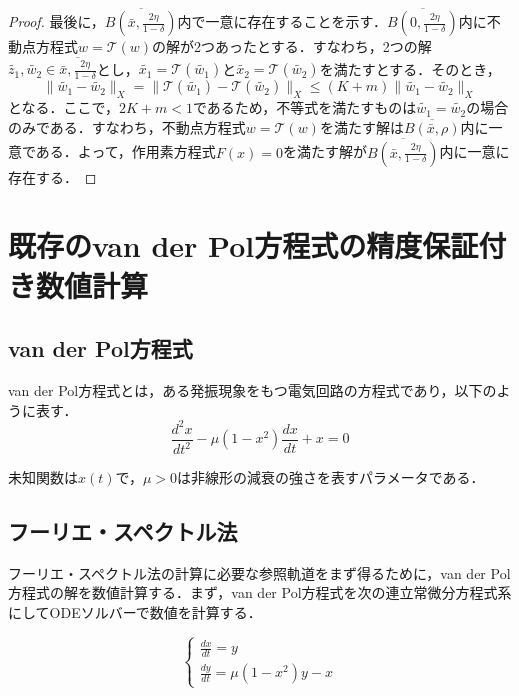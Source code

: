 \documentclass[11pt,a4paper,titlepage]{jsreport}
\theoremstyle{definition}
\providecommand{\DIFdelbegin}{} %
\providecommand{\DIFdelend}{} %
\newcommand{\DIFscaledelfig}{0.5}
\newlength{\DIFdelgraphicswidth} %
\newlength{\DIFdelgraphicsheight} %
\newcommand{\DIFdelincludegraphics}[2][]{%
\sbox{\DIFdelgraphicsbox}{\DIFOincludegraphics[#1]{#2}}%
\settoboxwidth{\DIFdelgraphicswidth}{\DIFdelgraphicsbox} %
\settoboxtotalheight{\DIFdelgraphicsheight}{\DIFdelgraphicsbox} %
\scalebox{\DIFscaledelfig}{%
\parbox[b]{\DIFdelgraphicswidth}{\usebox{\DIFdelgraphicsbox}\\[-\baselineskip] \rule{\DIFdelgraphicswidth}{0em}}\llap{\resizebox{\DIFdelgraphicswidth}{\DIFdelgraphicsheight}{%
\setlength{\unitlength}{\DIFdelgraphicswidth}%
\begin{picture}(1,1)%
\thicklines\linethickness{2pt} %
{\color[rgb]{1,0,0}\put(0,0){\framebox(1,1){}}}%
{\color[rgb]{1,0,0}\put(0,0){\line( 1,1){1}}}%
{\color[rgb]{1,0,0}\put(0,1){\line(1,-1){1}}}%
\end{picture}%
}\hspace*{3pt}}} %
} %
\DeclareRobustCommand{\DIFdelbegin}{\DIFOdelbegin \let\includegraphics\DIFdelincludegraphics} %
\DeclareRobustCommand{\DIFdelend}{\DIFOaddend \let\includegraphics\DIFOincludegraphics} %
\begin{document}
\begin{proof}
  最後に，$\overline{B\left(\bar{x},\frac{2\eta}{1-\delta}\right)}$内で一意に存在することを示す．$\overline{B\left(0,\frac{2\eta}{1-\delta}\right)}$内に不動点方程式$w=\mathcal{T}(w)$の解が2つあったとする．すなわち，2つの解$\tilde{z_1},\tilde{w_2}\in\overline{\bar{x},\frac{2\eta}{1-\delta}}$とし，$\tilde{x_1}=\mathcal{T}(\tilde{w_1})$と$\tilde{x_2}=\mathcal{T}(\tilde{w_2})$を満たすとする．そのとき，
  \begin{equation*}
    \|\tilde{w_1}-\tilde{w_2}\|_X = \|\mathcal{T}(\tilde{w_1})-\mathcal{T}(\tilde{w_2})\|_X \leq (K+m)\|\tilde{w_1}-\tilde{w_2}\|_X
  \end{equation*}
  となる．ここで，$2K+m<1$であるため，不等式を満たすものは$\tilde{w_1}=\tilde{w_2}$の場合のみである．すなわち，不動点方程式$w=\mathcal{T}(w)$を満たす解は$\overline{B\left(\bar{x},\rho\right)}$内に一意である．よって，作用素方程式$F(x)=0$を満たす解が$\overline{B(\bar{x},\frac{2\eta}{1-\delta})}$内に一意に存在する．

\end{proof}


\chapter{既存のvan der Pol方程式の精度保証付き数値計算\cite{github}}

\section{van der Pol方程式}
van der Pol方程式とは，ある発振現象をもつ電気回路の方程式であり，以下のように表す．
\begin{equation*}
  \frac{d^2x}{dt^2} - \mu (1-x^2)\frac{dx}{dt}+x=0
\end{equation*}

未知関数は$x(t)$で，$\mu >0$は非線形の減衰の強さを表すパラメータである．


\section{フーリエ・スペクトル法}
\DIFdelbegin %
\DIFdelend フーリエ・スペクトル法の計算に必要な参照軌道をまず得るために，van der Pol方程式の解を数値計算する．まず，van der Pol方程式を次の連立常微分方程式系にしてODEソルバーで数値を計算する．

\begin{equation*}
  \begin{cases}
    \frac{dx}{dt} = y \\
    \frac{dy}{dt} = \mu (1-x^2)y-x
  \end{cases}
\end{equation*}
\end{document}
